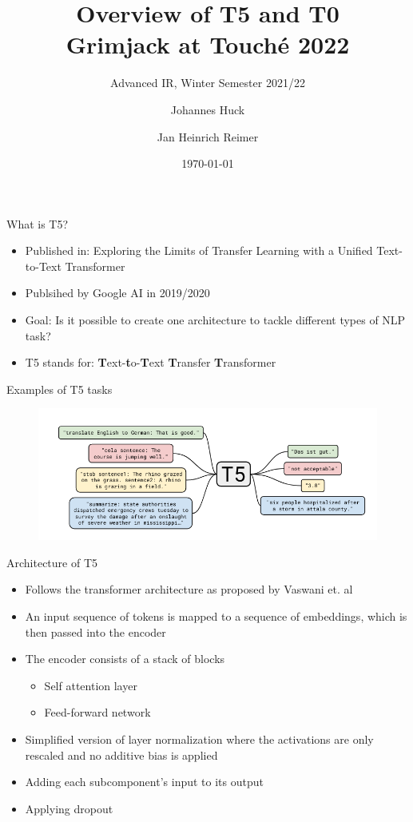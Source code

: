 \documentclass[english]{mlutalk}
\title{Overview of T5 and T0\\Grimjack at Touché 2022}
\subtitle{Advanced IR, Winter Semester 2021/22}
\author{Johannes Huck \and Jan Heinrich Reimer}
\institute{Martin Luther University Halle-Wittenberg}
\date{\today}
\begin{document}
\titleframe

\begin{frame}{What is T5?~\cite{RaffelSRLNMZLL2020}}
  \begin{itemize}
    \item Published in: Exploring the Limits of Transfer Learning with a Unified
    Text-to-Text Transformer
    \item Publsihed by Google AI in 2019/2020
    \item Goal: Is it possible to create one architecture to tackle different types of NLP task? 
    \item T5 stands for: \textbf{T}ext-\textbf{t}o-\textbf{T}ext \textbf{T}ransfer \textbf{T}ransformer
  \end{itemize}
\end{frame}

\begin{frame}{Examples of T5 tasks}
  \begin{figure}
      \center
      \includegraphics[scale=0.45]{figures/t5-examples.png}
  \end{figure}
\end{frame}

\begin{frame}{Architecture of T5}
    \begin{itemize}
      \item Follows the transformer architecture as proposed by Vaswani et. al~\cite{VaswaniSPUJGKP2017}
      \item An input sequence of tokens is mapped to
      a sequence of embeddings, which is then passed into the encoder
      \item The encoder consists of a stack of blocks
      \begin{itemize}
        \item Self attention layer
        \item Feed-forward network
      \end{itemize}
      \item Simplified version of layer normalization where
      the activations are only rescaled and no additive bias is applied
      \item Adding each subcomponent’s input to its output
      \item Applying dropout
    \end{itemize}
\end{frame}
\end{document}
